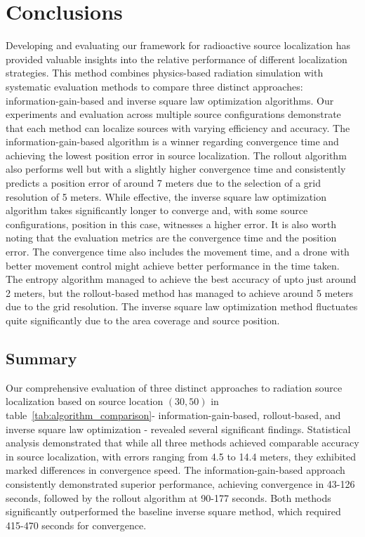 \documentclass[../report.tex]{subfiles}
\begin{document}
    \section{Conclusions}
    \label{sec:conclusions}
    Developing and evaluating our framework for radioactive source localization has provided valuable insights into the relative performance of different 
    localization strategies. This method combines physics-based radiation simulation with systematic evaluation methods to compare three distinct approaches: information-gain-based
    and inverse square law optimization algorithms. Our experiments and evaluation across multiple source configurations demonstrate that each method can localize sources with
    varying efficiency and accuracy. The information-gain-based algorithm is a winner regarding convergence time and achieving the lowest
    position error in source localization. The rollout algorithm also performs well but with a slightly higher convergence time and consistently predicts a position error of around 7 meters due to the selection of a grid resolution of 5 meters. While effective, the inverse square law optimization algorithm 
    takes significantly longer to converge and, with some source configurations, position in this case, witnesses a higher error. It is also worth noting that the evaluation metrics are the convergence time and the position error. The convergence time also includes the movement time, and a 
    drone with better movement control might achieve better performance in the time taken. The entropy algorithm managed to achieve the best accuracy of upto
    just around 2 meters, but the rollout-based method has managed to achieve around 5 meters due to the grid resolution. The inverse square law optimization 
    method fluctuates quite significantly due to the area coverage and source position. 

    \subsection{Summary}
    \label{sec:conclusions:summary}

    Our comprehensive evaluation of three distinct approaches to radiation source localization based on source location $(30,50)$ in 
    table~\ref{tab:algorithm_comparison}- information-gain-based, rollout-based, and inverse square law 
    optimization - revealed several significant findings. Statistical analysis demonstrated that while all three methods achieved comparable accuracy in source 
    localization, with errors ranging from 4.5 to 14.4 meters, they exhibited marked differences in convergence speed. The information-gain-based approach 
    consistently demonstrated superior performance, achieving convergence in 43-126 seconds, followed by the rollout algorithm at 90-177 seconds. Both methods 
    significantly outperformed the baseline inverse square method, which required 415-470 seconds for convergence.
\end{document}
